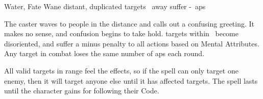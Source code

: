   {Water, Fate}%
  {Wane}%
  {distant, duplicated}%
  {}%
  { targets \spellRange\ away suffer -~\glspl{ap}}%
  {
    The caster waves to people in the distance and calls out a confusing greeting.
    It makes no sense, and confusion begins to take hold.
     targets within \spellRange\ become disoriented, and suffer a minus  penalty to all actions based on Mental Attributes.
    Any target in combat loses the same number of \glspl{ap} each round.

    All valid targets in range feel the effects, so if the spell can only target one enemy, then it will target anyone else until it has affected  targets.
    The spell lasts until the character gains  for following their Code.
  }
